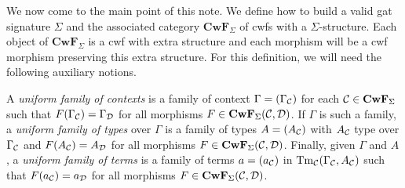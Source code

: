 \documentclass{lmcs}
\def\D{\mathcal{D}}
\def\Cwf{\mathbf{CwF}}
\begin{document}
We now come to the main point of this note.
We define how to build a valid gat signature $\Sigma$ and the associated
category $\Cwf_{\Sigma}$ of cwfs with a $\Sigma$-structure.
Each object of $\Cwf_{\Sigma}$ is a cwf with extra structure and
each morphism will be a cwf morphism preserving this extra structure.
For this definition, we will need the following auxiliary notions.

A {\em uniform family of contexts} is a family of context $\Gamma = (\Gamma_{{\mathcal C}})$ for each
$\C \in \Cwf_{\Sigma}$ such that
$F(\Gamma_\C) = \Gamma_\D$ for all morphisms $F \in \Cwf_{\Sigma}(\C,\D)$.
If $\Gamma$ is such a family, a {\em uniform family of types} over $\Gamma$ is a
family of types $A = (A_{{\mathcal C}})$ with $A_{{\mathcal C}}$ type over $\Gamma_{{\mathcal C}}$ and
$F(A_{\C}) = A_{\D}$ for all morphisms $F \in \Cwf_{\Sigma}(\C,\D)$.
Finally, given $\Gamma$ and $A$, a {\em uniform family of terms} is a family
of terms $a = (a_{{\mathcal C}})$ in $\mathrm{Tm}_{{\mathcal C}}(\Gamma_{{\mathcal C}},A_{{\mathcal C}})$ such that
$F(a_{\C}) = a_{\D}$ for all morphisms $F \in \Cwf_{\Sigma}(\C,\D)$.
\end{document}
